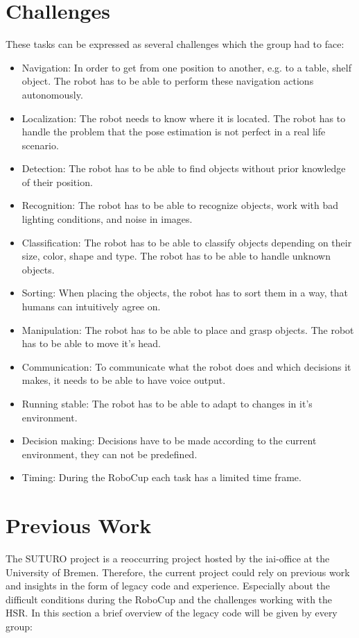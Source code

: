 \documentclass[main.tex]{subfiles}
\begin{document}
	\section{Challenges}
	\label{challanges}
	These tasks can be expressed as several challenges which the group had to face:
	\begin{itemize}
		\item Navigation: In order to get from one position to another, e.g. to a table, shelf object. The robot has to be able to perform these navigation actions autonomously.
		\item Localization: The robot needs to know where it is located. The robot has to handle the problem that the pose estimation is not perfect in a real life scenario.
		\item Detection: The robot has to be able to find objects without prior knowledge of their position.
		\item Recognition: The robot has to be able to recognize objects, work with bad lighting conditions, and noise in images.
		\item Classification: The robot has to be able to classify objects depending on their size, color, shape and type. The robot has to be able to handle unknown objects.
		\item Sorting: When placing the objects, the robot has to sort them in a way, that humans can intuitively agree on.
		\item Manipulation: The robot has to be able to place and grasp objects. The robot has to be able to move it's head.
		\item Communication: To communicate what the robot does and which decisions it makes, it needs to be able to have voice output.
		\item Running stable: The robot has to be able to adapt to changes in it's environment.
		\item Decision making: Decisions have to be made according to the current environment, they can not be predefined. 
		\item Timing: During the RoboCup each task has a limited time frame.
	\end{itemize}

	\section{Previous Work}
    \label{previous_work}
		The SUTURO project is a reoccurring project hosted by the iai-office at the University of Bremen. Therefore, the current project could rely on previous work and insights in the form of legacy code and experience. Especially about the difficult conditions during the RoboCup and the challenges working with the HSR. In this section a brief overview of the legacy code will be given by every group:
\end{document}
